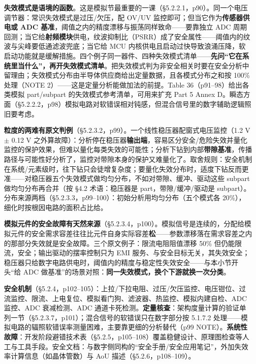 \textbf{失效模式是语境的函数}。这是模拟节最重要的一课（§5.2.2.1，p90）。同一个电压调节器：常识失效模式是过压/欠压，配 OV/UV 监控即可；但当它作为\textbf{传感器供电或 ADC 基准}，阈值之内的精度漂移与振荡同样致命——要靠独立 ADC 周期回测；当它给\textbf{射频模块}供电，纹波抑制比（PSRR）成了安全属性——阈值内的纹波与尖峰要低通滤波兜底；当它给 MCU 内核供电且启动过快导致浪涌压降，软启动功能就是缓解措施。四个例子同一器件、四种失效模式清单——\textbf{先问“它在系统里当什么”，再开失效模式清单}。把失效模式判为非安全相关时要在安全分析中留理由；失效模式分布由半导体供应商给出定量数据，且各模式分布之和按 100\% 处理（NOTE 2）——这是定量分析能做加法的前提。Table 36（p91–98）给出各类模拟 part/subpart 的失效模式参考清单，可用来扩充 Part 5 Annex D。瞬态方面（§5.2.2.2，p98）模拟电路对软错误相对钝感，但混合信号里的数字辅助逻辑照旧要考虑。

\textbf{粒度的两难有原文判例}（§5.2.3.2，p99）。一个线性稳压器配窗式电压监控（1.2 V \(\pm\) 0.12 V 之外算故障）：分析停在稳压器\textbf{输出端}，容易区分安全/危险失效并量化监控的保护效果，但难以量化每类失效的可能性；分析下钻到内部\textbf{带隙基准}，传播路径与可能性好分析了，监控对带隙本身的保护又难量化了。取舍规则：安全机制在系统/元素级时，往下钻只会徒增复杂度；要量化失效分布时，适度下钻反而更准——对稳压器五个失效模式做均匀分布，不如对带隙、缓冲、驱动这些 subpart 做均匀分布再合并（按 §4.2 术语：稳压器是 part，带隙/缓冲/驱动是 subpart）。分布来源两档（§5.2.3.3，p99–100）：初始分析用均匀分布（五个模式各 20\%），细化时按根因电路的面积占比给。

\textbf{模拟元件的安全故障有天然来源}（§5.2.3.4，p100）。模拟信号是连续的，分配给模拟元件的安全需求容差往往比元件自身实际容差\textbf{松}——参数漂移落在需求容差之内的那部分失效就是安全故障。三个原文例子：限流电阻阻值漂移 50\% 但仍能限流，安全；输出驱动的摆率控制只为 EMI 服务、与安全目标无关，其失效安全；稳压器只给数字电路供电时，阈值内的精度与稳定性失效安全——与本小节开头“给 ADC 做基准”的场景对照：\textbf{同一失效模式，换个下游就换一次分类}。

\textbf{安全机制}（§5.2.4，p102–105）：上拉/下拉电阻、过压/欠压监控、电压钳位、过流监控、限流、上电复位、模拟看门狗、滤波器、热监控、模拟内建自检、ADC 监控、ADC 衰减检测、ADC 通道卡死检测。\textbf{定量核查}：架构度量计算的验证单列一节（§5.2.3.7，p101）；混合信号的软错误只在数字部分按 5.1.7.2 处理——模拟电路的辐照软错误率测量困难，主要靠更细的分析替代（p99 NOTE）。\textbf{系统性故障}：开发阶段避错技术表（§5.2.5，p105–108）覆盖稳健设计、原理图检查等人工与工具手段。安全文档：与数字侧同构的“安全手册/安全应用笔记”，外加失效率计算信息（如晶体管数）与 AoU 描述（§5.2.6，p108–109）。

